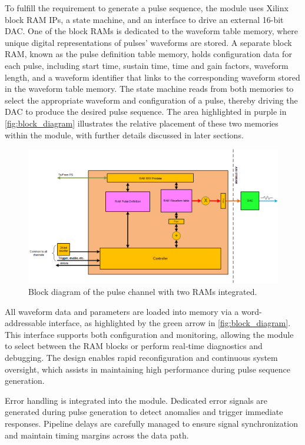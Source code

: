 To fulfill the requirement to generate a pulse sequence, the module uses Xilinx block RAM IPs, a state machine, and an interface to drive an external 16-bit DAC. One of the block RAMs is dedicated to the waveform table memory, where unique digital representations of pulses' waveforms are stored. A separate block RAM, known as the pulse definition table memory, holds configuration data for each pulse, including start time, sustain time, time and gain factors, waveform length, and a waveform identifier that links to the corresponding waveform stored in the waveform table memory. The state machine reads from both memories to select the appropriate waveform and configuration of a pulse, thereby driving the DAC to produce the desired pulse sequence. The area highlighted in purple in \autoref{fig:block_diagram} illustrates the relative placement of these two memories within the module, with further details discussed in later sections.

\begin{figure}[ht]
    \centering
    \includegraphics[width=1.0\linewidth]{figures/3.1.png}
    \caption{Block diagram of the pulse channel with two RAMs integrated.}
    \label{fig:block_diagram}
\end{figure}

All waveform data and parameters are loaded into memory via a word-addressable interface, as highlighted by the green arrow in \autoref{fig:block_diagram}. This interface supports both configuration and monitoring, allowing the module to select between the RAM blocks or perform real‐time diagnostics and debugging. The design enables rapid reconfiguration and continuous system oversight, which assists in maintaining high performance during pulse sequence generation.

Error handling is integrated into the module. Dedicated error signals are generated during pulse generation to detect anomalies and trigger immediate responses. Pipeline delays are carefully managed to ensure signal synchronization and maintain timing margins across the data path.

